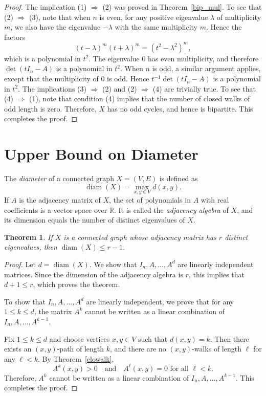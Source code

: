 \documentclass{amsart}
\theoremstyle{plain}
\newtheorem{theorem}{Theorem}[section]
\begin{document}
\begin{proof}
The implication (1) $\Rightarrow$ (2) was proved in Theorem~\ref{bip_mul}. To see that (2) $\Rightarrow$ (3), note that when $n$ is even, for any positive 
eigenvalue $\lambda$ of multiplicity $m$, we also have the eigenvalue $-\lambda$ 
with the same multiplicity $m$. Hence the factors
\[
(t - \lambda)^m (t + \lambda)^m = (t^2 - \lambda^2)^m,
\]
which is a polynomial in $t^2$. The eigenvalue $0$ has even multiplicity, and 
therefore $\det(tI_n - A)$ is a polynomial in $t^2$. When $n$ is odd, a similar argument applies, except that the multiplicity of $0$ 
is odd. Hence $t^{-1}\det(tI_n - A)$ is a polynomial in $t^2$. The implications (3) $\Rightarrow$ (2) and (2) $\Rightarrow$ (4) are trivially true. To see that (4) $\Rightarrow$ (1), note that condition (4) implies that the number 
of closed walks of odd length is zero. Therefore, $X$ has no odd cycles, and hence 
is bipartite. This completes the proof.
\end{proof}



\section{Upper Bound on Diameter}

The \emph{diameter} of a connected graph $X = (V, E)$ is defined as
\[
\operatorname{diam}(X) = \max_{x,y \in V} d(x,y).
\]
If $A$ is the adjacency matrix of $X$, the set of polynomials in $A$ with real 
coefficients is a vector space over $\mathbb{R}$. It is called the \emph{adjacency 
algebra} of $X$, and its dimension equals the number of distinct eigenvalues of $X$.

\begin{theorem}
If $X$ is a connected graph whose adjacency matrix has $r$ distinct eigenvalues, 
then $\operatorname{diam}(X) \le r - 1$.
\end{theorem}

\begin{proof}
Let $d = \operatorname{diam}(X)$. We show that $I_n, A, \dots, A^d$ are linearly 
independent matrices. Since the dimension of the adjacency algebra is $r$, this 
implies that $d + 1 \le r$, which proves the theorem.

To show that $I_n, A, \dots, A^d$ are linearly independent, we prove that for any 
$1 \le k \le d$, the matrix $A^k$ cannot be written as a linear combination of 
$I_n, A, \dots, A^{k-1}$.

Fix $1 \le k \le d$ and choose vertices $x, y \in V$ such that $d(x,y) = k$. 
Then there exists an $(x,y)$-path of length $k$, and there are no $(x,y)$-walks 
of length $\ell$ for any $\ell < k$. By Theorem~\ref{clowalk},
\[
A^k(x,y) > 0 \quad \text{and} \quad A^\ell(x,y) = 0 \text{ for all } \ell < k.
\]
Therefore, $A^k$ cannot be written as a linear combination of 
$I_n, A, \dots, A^{k-1}$. This completes the proof.
\end{proof}
\end{document}
